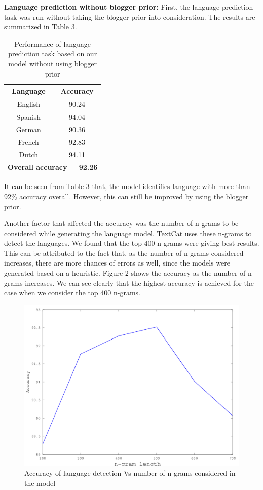 \documentclass[11pt]{article}
\begin{document}
{\textbf {Language prediction without blogger prior: }}  First, the language prediction task was run without taking the blogger prior into consideration. The results are summarized in Table 3.


\begin{table}
\begin{center}
\small
\begin{tabular}{|c|c|}
\hline
\textbf{Language} & \textbf{Accuracy} \\
\hline
English & 90.24\\
Spanish & 94.04 \\
German & 90.36 \\
French & 92.83 \\
Dutch & 94.11 \\ \hline
\multicolumn{2}{|c|}{\textbf{Overall accuracy = 92.26}} \\\hline
\end{tabular}
\caption{\footnotesize Performance of language prediction task based on our model without using blogger prior}
\end{center}
\end{table}

It can be seen from Table 3 that, the model identifies language with more than 92\% accuracy overall. However, this can still be improved by using the blogger prior.

Another factor that affected the accuracy was the number of n-grams to be considered while generating the language model. TextCat uses these n-grams to detect the languages. We found that the top 400 n-grams were giving best results. This can be attributed to the fact that, as the number of n-grams considered increases, there are more chances of errors as well, since the models were generated based on a heuristic. Figure 2 shows the accuracy as the number of n-grams increases. We can see clearly that the highest accuracy is achieved for the case when we consider the top 400 n-grams.

\begin{figure}[ht]
\includegraphics[scale=0.35]{ngramVsAccuracy.png}
\caption{\footnotesize Accuracy of language detection Vs number of n-grams considered in the model}
\label{fig:s3}
\end{figure}
\end{document}
